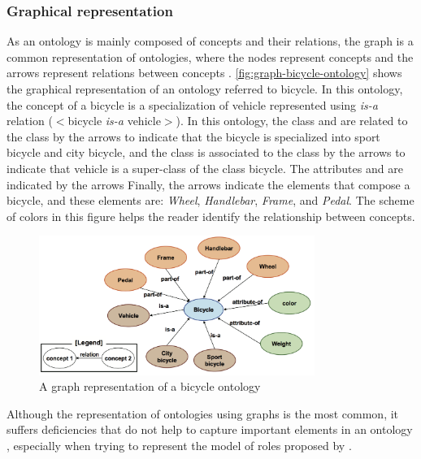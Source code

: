 \subsubsection{Graphical representation}
\label{subsubsec:graphical-representation}

As an ontology is mainly composed of concepts and their relations, the graph is a common representation of ontologies, where the nodes represent concepts and the arrows represent relations between concepts \cite{DiengHug1998}.
\autoref{fig:graph-bicycle-ontology} shows the graphical representation of an ontology referred to bicycle.
In this ontology, the concept of a bicycle is a specialization of vehicle represented using \emph{is-a} relation ($<$bicycle \emph{is-a} vehicle$>$).
In this ontology, the class  and  are related to the class  by the arrows  to indicate that the bicycle is specialized into sport bicycle and city bicycle, and the class  is associated to the class  by the arrows  to indicate that vehicle is a super-class of the class bicycle.
The attributes  and  are indicated by the arrows 
Finally, the arrows  indicate the elements that compose a bicycle, and these elements are: \emph{Wheel}, \emph{Handlebar}, \emph{Frame}, and \emph{Pedal}.
The scheme of colors in this figure helps the reader identify the relationship between concepts.

\begin{figure}[htb]
 \caption{A graph representation of a bicycle ontology}
 \label{fig:graph-bicycle-ontology}
 \centering
 \includegraphics[width=0.8\textwidth]{images/chap-general-background/graph-bicycle-ontology.png}
\end{figure}

Although the representation of ontologies using graphs is the most common, it suffers deficiencies that do not help to capture important elements in an ontology \cite{Devedzic2006}, especially when trying to represent the model of roles proposed by . 

